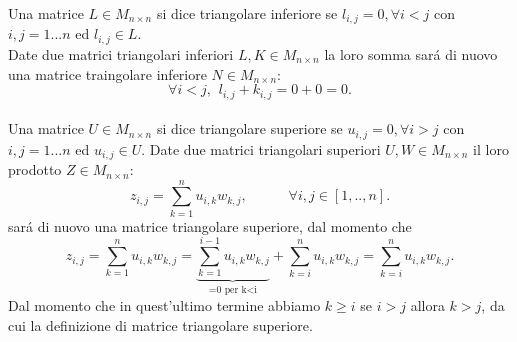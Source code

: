 Una matrice \( L \in M_{n \times n} \) si dice triangolare inferiore se \( l_{i,j}=0, \forall i<j \) con \(i,j = 1...n \) ed \( l_{i,j} \in L \).
\\
Date due matrici triangolari inferiori \( L,K \in M_{n \times n} \) la loro somma sar\'a di nuovo una matrice traingolare inferiore \( N \in M_{n \times n} \):
\[
 \forall i<j, \hspace{5pt} l_{i,j} + k_{i,j} = 0 + 0 = 0. 
\]
\\
Una matrice \( U \in M_{n \times n} \) si dice triangolare superiore se \( u_{i,j}=0, \forall i>j \) con \(i,j = 1...n \) ed \( u_{i,j} \in U \).
Date due matrici triangolari superiori  \( U,W \in M_{n \times n} \)  il loro prodotto  \( Z \in M_{n \times n} \):
\[
z_{i,j} = \sum_{k=1}^n u_{i,k} w_{k,j}, \hspace{35pt} \forall i,j \in [1,..,n].
\]
sar\'a di nuovo una matrice triangolare superiore, dal momento che 
\[
z_{i,j} =  \sum_{k=1}^n u_{i,k} w_{k,j} =  \underbrace{ \sum_{k=1}^{i-1} u_{i,k} w_{k,j} }_\text{=0 per k<i}  + \sum_{k=i}^n u_{i,k} w_{k,j} = \sum_{k=i}^n u_{i,k} w_{k,j}.
\]
Dal momento che in quest'ultimo termine abbiamo \( k \geq i \) se \( i>j \) allora \( k>j \), da cui la definizione di matrice triangolare superiore.
